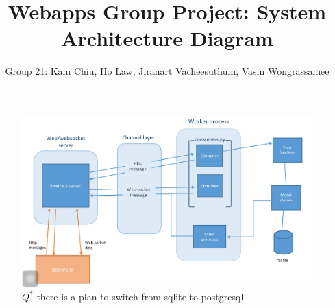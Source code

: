 \documentclass[11pt]{article}
\begin{document}
\title{Webapps Group Project: System Architecture Diagram}
\author{Group 21: Kam Chiu, Ho Law, Jiranart Vacheesuthum, Vasin Wongrassamee}

\maketitle

\begin{figure}[h]
\begin{minipage}{1.0\textwidth}
  \centering
  \includegraphics[width=.6\linewidth]{system_diagram.jpg}
  \caption{$Q^{*}$ there is a plan to switch from sqlite to postgresql}
\end{minipage}
\end{figure}
\end{document}
